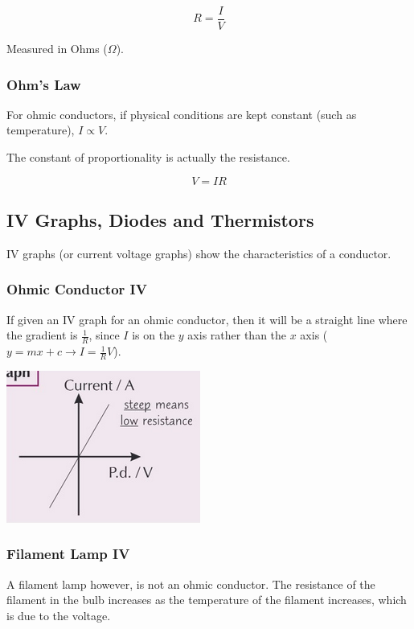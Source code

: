 \documentclass[a4paper, 12pt]{article}
\begin{document}
$$
R = \frac{I}{V}
$$

Measured in Ohms ($\Omega$).

\subsubsection{Ohm's Law}

For ohmic conductors, if physical conditions are kept constant (such as temperature), $I \propto V$.

The constant of proportionality is actually the resistance.

$$
V = IR
$$

\subsection{IV Graphs, Diodes and Thermistors}

IV graphs (or current voltage graphs) show the characteristics of a conductor.

\subsubsection{Ohmic Conductor IV}

If given an IV graph for an ohmic conductor, then it will be a straight line where the gradient is $\frac{1}{R}$, since $I$ is on the $y$ axis rather than the $x$ axis ($y = mx + c \rightarrow I = \frac{1}{R}V$).

\begin{center}
\includegraphics[]{images/ohmicCond.png}
\end{center}

\subsubsection{Filament Lamp IV}

A filament lamp however, is not an ohmic conductor. The resistance of the filament in the bulb increases as the temperature of the filament increases, which is due to the voltage.
\end{document}

